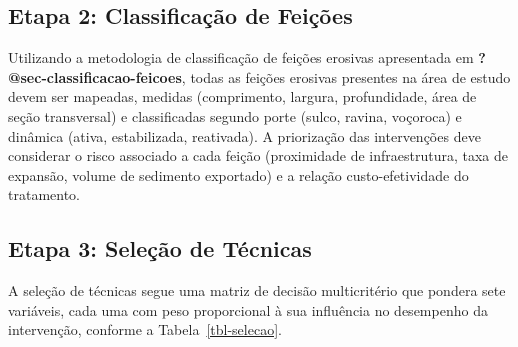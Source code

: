 \documentclass[
  portuguese,
  11pt,
  a4paper,
  open=any]{scrbook}
\begin{document}
\subsection{Etapa 2: Classificação de
Feições}\label{etapa-2-classificauxe7uxe3o-de-feiuxe7uxf5es}

Utilizando a metodologia de classificação de feições erosivas
apresentada em \textbf{?@sec-classificacao-feicoes}, todas as feições
erosivas presentes na área de estudo devem ser mapeadas, medidas
(comprimento, largura, profundidade, área de seção transversal) e
classificadas segundo porte (sulco, ravina, voçoroca) e dinâmica (ativa,
estabilizada, reativada). A priorização das intervenções deve considerar
o risco associado a cada feição (proximidade de infraestrutura, taxa de
expansão, volume de sedimento exportado) e a relação custo-efetividade
do tratamento.

\subsection{Etapa 3: Seleção de
Técnicas}\label{etapa-3-seleuxe7uxe3o-de-tuxe9cnicas}

A seleção de técnicas segue uma matriz de decisão multicritério que
pondera sete variáveis, cada uma com peso proporcional à sua influência
no desempenho da intervenção, conforme a Tabela~\ref{tbl-selecao}.
\end{document}

